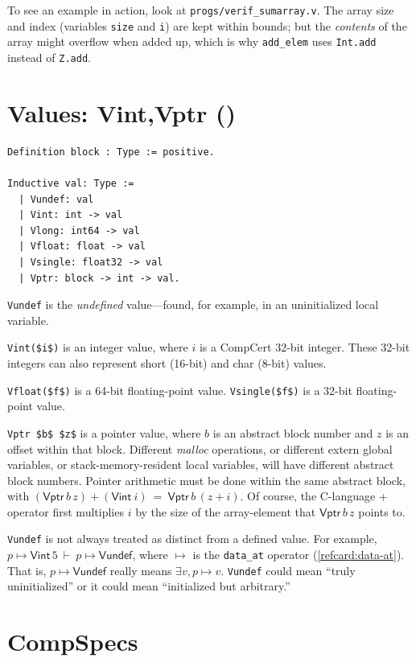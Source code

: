 \documentclass[12pt,fleqn,openany,oneside,showtrims]{memoir}
\newcommand{\ychapter}[2]{\chapter[#1]{#1 \hfill \normalsize #2}}
\begin{document}
To see an example in action,
look at \lstinline{progs/verif_sumarray.v}.
The array size and index
(variables \lstinline{size} and \lstinline{i})
are kept within bounds;
but the \emph{contents} of the array might
overflow when added up, which is why
\lstinline{add_elem}
uses \lstinline{Int.add} instead of 
\lstinline{Z.add}.

\ychapter{Values: {\upshape\textsf{Vint,Vptr}}}{(\file{compcert/common/Values.v})}

\begin{lstlisting}
Definition block : Type := positive.

Inductive val: Type :=
  | Vundef: val
  | Vint: int -> val
  | Vlong: int64 -> val
  | Vfloat: float -> val
  | Vsingle: float32 -> val
  | Vptr: block -> int -> val.
\end{lstlisting}
\lstinline{Vundef} is the \emph{undefined} value---found, for example,
in an uninitialized local variable.  

\lstinline{Vint($i$)} is an integer value,
where $i$ is a CompCert 32-bit integer.  These 32-bit integers
can also
represent short (16-bit) and char (8-bit) values.

\lstinline{Vfloat($f$)} is a 64-bit floating-point value.\newline
\lstinline{Vsingle($f$)} is a 32-bit floating-point value.

\lstinline{Vptr $b$ $z$} is a pointer value,
where $b$ is an abstract block number and $z$ is an offset
within that block.  Different \emph{malloc} operations,
or different extern global variables, or 
stack-memory-resident local variables,
will have different abstract block numbers.
Pointer arithmetic must be done within the same abstract block,
with $(\mathsf{Vptr}\,b\,z)+(\mathsf{Vint}~i)~=~\mathsf{Vptr}\,b\,(z+i)$.
Of course, the C-language + operator first multiplies $i$
by the size of the array-element that 
$\mathsf{Vptr}\,b\,z$ points to.

\lstinline{Vundef} is not always treated as distinct from a defined value.
For example, $p\mapsto \mathsf{Vint}\,5 ~\vdash~ p\mapsto \mathsf{Vundef}$,
where $\mapsto$ is the \lstinline{data_at} operator (\autoref{refcard:data-at}).
That is, $p\mapsto \mathsf{Vundef}$ really means
$\exists v, p\mapsto v$.  \lstinline{Vundef} could mean
``truly uninitialized'' or it could mean ``initialized but arbitrary.''


\chapter{CompSpecs}
\label{refcard:compspecs}
\end{document}
